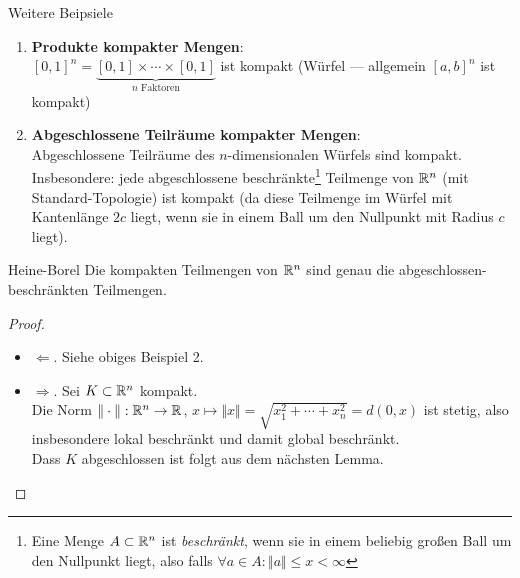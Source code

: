 \begin{example}{Weitere Beipsiele}
  \begin{enumerate}
    \item \textbf{Produkte kompakter Mengen}: \\
      $ [0,1]^n = \underbrace{[0,1] \times \cdots \times [0,1]}_{n \text{ Faktoren}} $ ist kompakt (Würfel --- allgemein $ [a,b]^n $ ist kompakt) 
    \item \textbf{Abgeschlossene Teilräume kompakter Mengen}: \\
      Abgeschlossene Teilräume des $ n $-dimensionalen Würfels sind kompakt. Insbesondere: jede abgeschlossene beschränkte\footnote{Eine Menge $ A \subset \mathbb{R}^n $ ist \emph{beschränkt}, wenn sie in einem beliebig großen Ball um den Nullpunkt liegt, also falls $ \forall a \in A : \Vert a \Vert \leq x < \infty $} Teilmenge von $ \mathbb{R}^n $ (mit Standard-Topologie) ist kompakt (da diese Teilmenge im Würfel mit Kantenlänge $ 2c $ liegt, wenn sie in einem Ball um den Nullpunkt mit Radius $ c $ liegt).
  \end{enumerate}
\end{example}

\begin{theorem}{Heine-Borel}
  Die kompakten Teilmengen von $ \mathbb{R}^n $ sind genau die abgeschlossen-beschränkten Teilmengen.
  \begin{proof}
    \begin{itemize}
      \item $ \Leftarrow $. Siehe obiges Beispiel 2.
      \item $ \Rightarrow $. Sei $ K \subset \mathbb{R}^n $ kompakt. \\
        Die Norm $ \Vert \cdot \Vert : \mathbb{R}^n \to \mathbb{R} $, $ x \mapsto \Vert x \Vert = \sqrt{x_1^2 + \cdots + x_n^2} = d(0,x) $ ist stetig, also insbesondere lokal beschränkt und damit global beschränkt. \\
        Dass $ K $ abgeschlossen ist folgt aus dem nächsten Lemma.
    \end{itemize}
  \end{proof}
\end{theorem}

